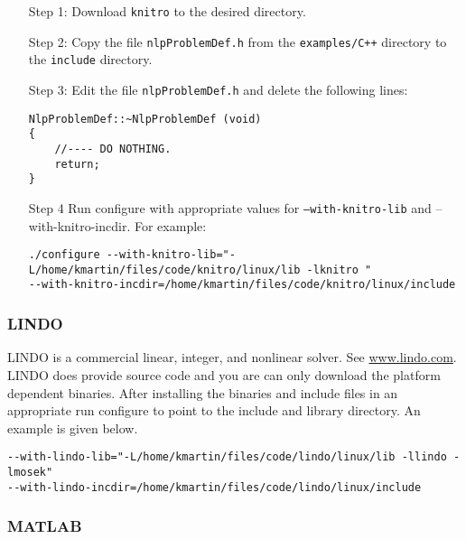 \documentclass[11pt]{article}
\renewcommand{\_}{{\char"5F}}
\renewcommand{\{}{{\char"7B}}
\renewcommand{\}}{{\char"7D}}
\renewcommand{\^}{{\char"0D}}
\renewcommand{\'}{{\char"0D}}
\begin{document}
\begin{itemize}



\item[Step 1:]  Download {\tt knitro} to the desired directory.


\item[Step 2:] Copy the file {\tt nlpProblemDef.h} from the {\tt examples/C++} directory to the {\tt include} directory.

\item[Step 3:]  Edit the file {\tt nlpProblemDef.h} and delete the following lines:

\begin{verbatim}
NlpProblemDef::~NlpProblemDef (void)
{
    //---- DO NOTHING.
    return;
}
\end{verbatim}




\item[Step 4] Run configure with appropriate values for  {\tt --with-knitro-lib} and {--with-knitro-incdir}. For example:

\begin{verbatim}
./configure --with-knitro-lib="-L/home/kmartin/files/code/knitro/linux/lib -lknitro " 
--with-knitro-incdir=/home/kmartin/files/code/knitro/linux/include
\end{verbatim}

\end{itemize}


\subsubsection{LINDO}

LINDO is a commercial linear, integer, and nonlinear solver. See \url{www.lindo.com}.  LINDO does provide source code and you are can only download the platform dependent binaries. After installing the binaries and include files in an appropriate run configure to point to the include and library directory. An example is given below.

\begin{verbatim}
--with-lindo-lib="-L/home/kmartin/files/code/lindo/linux/lib -llindo -lmosek" 
--with-lindo-incdir=/home/kmartin/files/code/lindo/linux/include
\end{verbatim}


\subsubsection{MATLAB}
\end{document}
